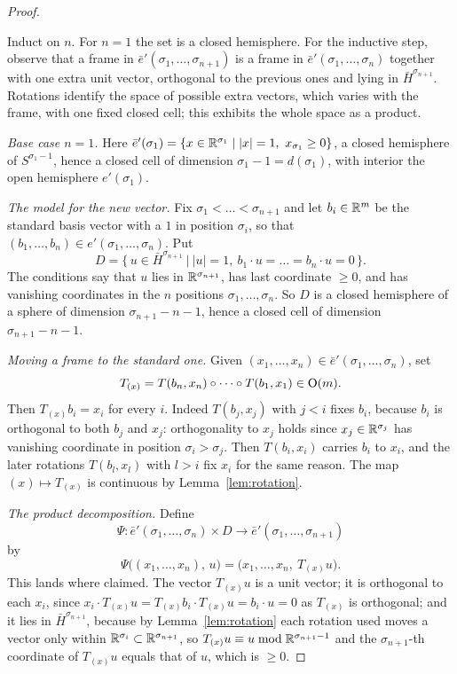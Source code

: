 \begin{proof}
\begin{strategy}
Induct on $n$. For $n=1$ the set is a closed hemisphere. For the inductive step,
observe that a frame in $\bar e'(\sigma_1,\dots,\sigma_{n+1})$ is a frame in
$\bar e'(\sigma_1,\dots,\sigma_n)$ together with one extra unit vector,
orthogonal to the previous ones and lying in $\bar H^{\sigma_{n+1}}$. Rotations
identify the space of possible extra vectors, which varies with the frame, with
one fixed closed cell; this exhibits the whole space as a product.
\end{strategy}

 \emph{Base case $n=1$.} Here
$\bar e'(\sigma_1)=\{x\in\mathbb{R}^{\sigma_1}\mid |x|=1,\ x_{\sigma_1}\ge0\}$, a closed
hemisphere of $S^{\sigma_1-1}$, hence a closed cell of dimension
$\sigma_1-1=d(\sigma_1)$, with interior the open hemisphere $e'(\sigma_1)$.

 \emph{The model for the new vector.} Fix
$\sigma_1<\dots<\sigma_{n+1}$ and let $b_i\in\mathbb{R}^m$ be the standard basis vector
with a $1$ in position $\sigma_i$, so that
$(b_1,\dots,b_n)\in e'(\sigma_1,\dots,\sigma_n)$. Put
\[
D=\big\{\,u\in\bar H^{\sigma_{n+1}}\ \big|\ |u|=1,\
b_1\cdot u=\dots=b_n\cdot u=0\,\big\}.
\]
The conditions say that $u$ lies in $\mathbb{R}^{\sigma_{n+1}}$, has last coordinate
$\ge0$, and has vanishing coordinates in the $n$ positions
$\sigma_1,\dots,\sigma_n$. So $D$ is a closed hemisphere of a sphere of
dimension $\sigma_{n+1}-n-1$, hence a closed cell of dimension
$\sigma_{n+1}-n-1$.

 \emph{Moving a frame to the standard one.} Given
$(x_1,\dots,x_n)\in\bar e'(\sigma_1,\dots,\sigma_n)$, set
\[
T_{(x)}=T(b_n,x_n)\circ\dots\circ T(b_1,x_1)\in\operatorname{O}(m).
\]
Then $T_{(x)}b_i=x_i$ for every $i$. Indeed $T(b_j,x_j)$ with $j<i$ fixes
$b_i$, because $b_i$ is orthogonal to both $b_j$ and $x_j$: orthogonality to
$x_j$ holds since $x_j\in\mathbb{R}^{\sigma_j}$ has vanishing coordinate in position
$\sigma_i>\sigma_j$. Then $T(b_i,x_i)$ carries $b_i$ to $x_i$, and the later
rotations $T(b_l,x_l)$ with $l>i$ fix $x_i$ for the same reason. The map
$(x)\mapsto T_{(x)}$ is continuous by Lemma~\ref{lem:rotation}.

 \emph{The product decomposition.} Define
\[
\Psi\colon\bar e'(\sigma_1,\dots,\sigma_n)\times D
\longrightarrow \bar e'(\sigma_1,\dots,\sigma_{n+1})
\]
by
\[
\Psi\big((x_1,\dots,x_n),\,u\big)=\big(x_1,\dots,x_n,\ T_{(x)}u\big).
\]
This lands where claimed. The vector $T_{(x)}u$ is a unit vector; it is
orthogonal to each $x_i$, since
$x_i\cdot T_{(x)}u=T_{(x)}b_i\cdot T_{(x)}u=b_i\cdot u=0$ as $T_{(x)}$ is
orthogonal; and it lies in $\bar H^{\sigma_{n+1}}$, because by
Lemma~\ref{lem:rotation} each rotation used moves a vector only within
$\mathbb{R}^{\sigma_i}\subset\mathbb{R}^{\sigma_{n+1}}$, so
$T_{(x)}u\equiv u\bmod\mathbb{R}^{\sigma_{n+1}-1}$ and the $\sigma_{n+1}$-th coordinate
of $T_{(x)}u$ equals that of $u$, which is $\ge0$.


\end{proof}
